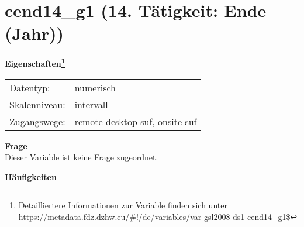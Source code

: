 
    \setcounter{footnote}{0}

    \vspace*{-1.8cm}
	\section{cend14\_g1 (14. Tätigkeit: Ende (Jahr))}
	\label{section:cend14_g1}



    \vspace*{0.5cm}
    \noindent\textbf{Eigenschaften\footnote{Detailliertere Informationen zur Variable finden sich unter
		\url{https://metadata.fdz.dzhw.eu/\#!/de/variables/var-gsl2008-ds1-cend14_g1$}}}\\
	\begin{tabularx}{\hsize}{@{}lX}
	Datentyp: & numerisch \\
	Skalenniveau: & intervall \\
	Zugangswege: &
	  remote-desktop-suf, 
	  onsite-suf
 \\
    \end{tabularx}



		\vspace*{0.5cm}
		\noindent\textbf{Frage}\\
		Dieser Variable ist keine Frage zugeordnet.





        		\vspace*{0.5cm}
                \noindent\textbf{Häufigkeiten}

